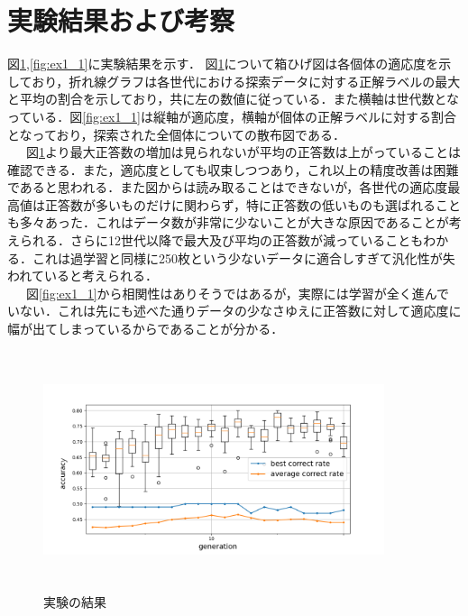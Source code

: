 \documentclass[twocolumn]{jarticle}     %
\begin{document}
\begin{table}[h]
	\centering
	\caption{GAの設定\label{tb:GApara}}
\end{table}

\section{実験結果および考察}
図\ref{fig:ex1},\ref{fig:ex1_1}に実験結果を示す．
図\ref{fig:ex1}について箱ひげ図は各個体の適応度を示しており，折れ線グラフは各世代における探索データに対する正解ラベルの最大と平均の割合を示しており，共に左の数値に従っている．また横軸は世代数となっている．図\ref{fig:ex1_1}は縦軸が適応度，横軸が個体の正解ラベルに対する割合となっており，探索された全個体についての散布図である．\\
\ \ \ 図\ref{fig:ex1}より最大正答数の増加は見られないが平均の正答数は上がっていることは確認できる．また，適応度としても収束しつつあり，これ以上の精度改善は困難であると思われる．また図からは読み取ることはできないが，各世代の適応度最高値は正答数が多いものだけに関わらず，特に正答数の低いものも選ばれることも多々あった．これはデータ数が非常に少ないことが大きな原因であることが考えられる．さらに12世代以降で最大及び平均の正答数が減っていることもわかる．これは過学習と同様に250枚という少ないデータに適合しすぎて汎化性が失われていると考えられる．\\
\ \ \ 図\ref{fig:ex1_1}から相関性はありそうではあるが，実際には学習が全く進んでいない．これは先にも述べた通りデータの少なさゆえに正答数に対して適応度に幅が出てしまっているからであることが分かる．\\ 
\begin{figure}[h]
	\begin{center}
		\vspace*{-3mm}
		\hspace*{-8mm}
		\includegraphics[height=70mm,width=100mm]{graph.png}
		\caption{実験の結果\label{fig:ex1}}
	\end{center}
\end{figure}
\end{document}
